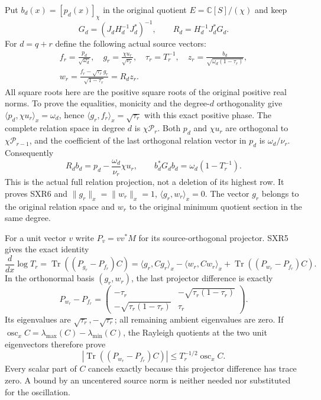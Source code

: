 Put $b_d(x)=[p_d(x)]_\chi$ in the original quotient
$E=\mathbb C[S]/(\chi)$ and keep
\[
 G_d=(J_dH_d^{-1}J_d^*)^{-1},\qquad R_d=H_d^{-1}J_d^*G_d.
\]
For $d=q+r$ define the following actual source vectors:
\begin{equation}\tag{SXR6}
\begin{gathered}
 f_r=\frac{p_d}{\sqrt{\omega_d}},\quad
 g_r=\frac{\chi u_r}{\sqrt{\nu_r}},\quad
 \tau_r=T_r^{-1},\quad
 z_r=\frac{b_d}{\sqrt{\omega_d(1-\tau_r)}},\\
 w_r=\frac{f_r-\sqrt{\tau_r}g_r}{\sqrt{1-\tau_r}}
           =R_d z_r.
\end{gathered}
\end{equation}
All square roots here are the positive square roots of the original
positive real norms. To prove the equalities, monicity and the
degree-$d$ orthogonality give
$\langle p_d,\chi u_r\rangle_x=\omega_d$, hence
$\langle g_r,f_r\rangle_x=\sqrt{\tau_r}$ with this exact positive
phase. The complete relation space in degree $d$ is
$\chi\mathcal P_r$. Both $p_d$ and $\chi u_r$ are orthogonal to
$\chi\mathcal P_{r-1}$, and the coefficient of the last orthogonal
relation vector in $p_d$ is $\omega_d/\nu_r$. Consequently
\begin{equation}\tag{SXR7}
 R_db_d=p_d-\frac{\omega_d}{\nu_r}\chi u_r,
 \qquad b_d^*G_db_d=\omega_d(1-T_r^{-1}).
\end{equation}
This is the actual full relation projection, not a deletion of its
highest row. It proves SXR6 and
$\|g_r\|_x=\|w_r\|_x=1$, $\langle g_r,w_r\rangle_x=0$.
The vector $g_r$ belongs to the original relation space and $w_r$
to the original minimum quotient section in the same degree.

For a unit vector $v$ write $P_v=vv^*M$ for its source-orthogonal
projector. SXR5 gives the exact identity
\begin{equation}\tag{SXR8}
 \frac{d}{dx}\log T_r
   =\operatorname{Tr}((P_{g_r}-P_{f_r})C)
   =\langle g_r,Cg_r\rangle_x-\langle w_r,Cw_r\rangle_x
      +\operatorname{Tr}((P_{w_r}-P_{f_r})C).
\end{equation}
In the orthonormal basis $(g_r,w_r)$, the last projector difference
is exactly
\[
 P_{w_r}-P_{f_r}=
 \begin{pmatrix}
 -\tau_r&-\sqrt{\tau_r(1-\tau_r)}\\
 -\sqrt{\tau_r(1-\tau_r)}&\tau_r
 \end{pmatrix}.
\]
Its eigenvalues are $\sqrt{\tau_r},-\sqrt{\tau_r}$; all remaining
ambient eigenvalues are zero. If
$\operatorname{osc}_x C=\lambda_{\max}(C)-\lambda_{\min}(C)$,
the Rayleigh quotients at the two unit eigenvectors therefore prove
\begin{equation}\tag{SXR9}
 |\operatorname{Tr}((P_{w_r}-P_{f_r})C)|
          \le T_r^{-1/2}\operatorname{osc}_x C.
\end{equation}
Every scalar part of $C$ cancels exactly because this projector
difference has trace zero. A bound by an uncentered source norm is
neither needed nor substituted for the oscillation.

